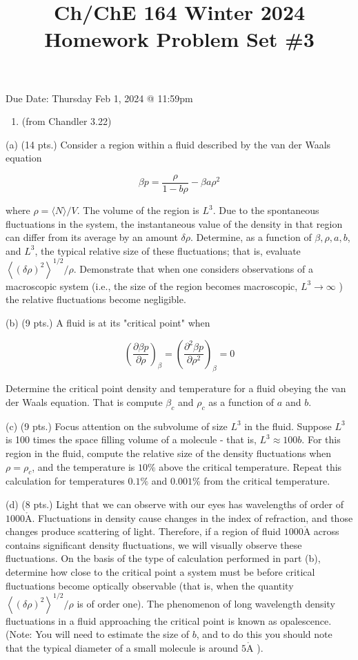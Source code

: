\documentclass[10pt]{article}
\title{Ch/ChE 164 Winter 2024 
 Homework Problem Set \#3 }
\author{}
\date{}
\def\AA{\mathring{\mathrm{A}}}
\begin{document}
\maketitle
Due Date: Thursday Feb 1, 2024 @ 11:59pm

\begin{enumerate}
  \item (from Chandler 3.22)
\end{enumerate}

(a) (14 pts.) Consider a region within a fluid described by the van der Waals equation

$$
\beta p=\frac{\rho}{1-b \rho}-\beta a \rho^{2}
$$

where $\rho=\langle N\rangle / V$. The volume of the region is $L^{3}$. Due to the spontaneous fluctuations in the system, the instantaneous value of the density in that region can differ from its average by an amount $\delta \rho$. Determine, as a function of $\beta, \rho, a, b$, and $L^{3}$, the typical relative size of these fluctuations; that is, evaluate $\left\langle(\delta \rho)^{2}\right\rangle^{1 / 2} / \rho$. Demonstrate that when one considers observations of a macroscopic system (i.e., the size of the region becomes macroscopic, $L^{3} \rightarrow \infty$ ) the relative fluctuations become negligible.

(b) (9 pts.) A fluid is at its "critical point" when

$$
\left(\frac{\partial \beta p}{\partial \rho}\right)_{\beta}=\left(\frac{\partial^{2} \beta p}{\partial \rho^{2}}\right)_{\beta}=0
$$

Determine the critical point density and temperature for a fluid obeying the van der Waals equation. That is compute $\beta_{c}$ and $\rho_{c}$ as a function of $a$ and $b$.

(c) (9 pts.) Focus attention on the subvolume of size $L^{3}$ in the fluid. Suppose $L^{3}$ is 100 times the space filling volume of a molecule - that is, $L^{3} \approx 100 b$. For this region in the fluid, compute the relative size of the density fluctuations when $\rho=\rho_{c}$, and the temperature is $10 \%$ above the critical temperature. Repeat this calculation for temperatures $0.1 \%$ and $0.001 \%$ from the critical temperature.

(d) (8 pts.) Light that we can observe with our eyes has wavelengths of order of $1000 \AA$. Fluctuations in density cause changes in the index of refraction, and those changes produce scattering of light. Therefore, if a region of fluid $1000 \AA$ across contains significant density fluctuations, we will visually observe these fluctuations. On the basis of the type of calculation performed in part (b), determine how close to the critical point a system must be before critical fluctuations become optically observable (that is, when the quantity $\left\langle(\delta \rho)^{2}\right\rangle^{1 / 2} / \rho$ is of order one). The phenomenon of long wavelength density fluctuations in a fluid approaching the critical point is known as opalescence. (Note: You will need to estimate the size of $b$, and to do this you should note that the typical diameter of a small molecule is around $5 \AA$ ).
\end{document}
